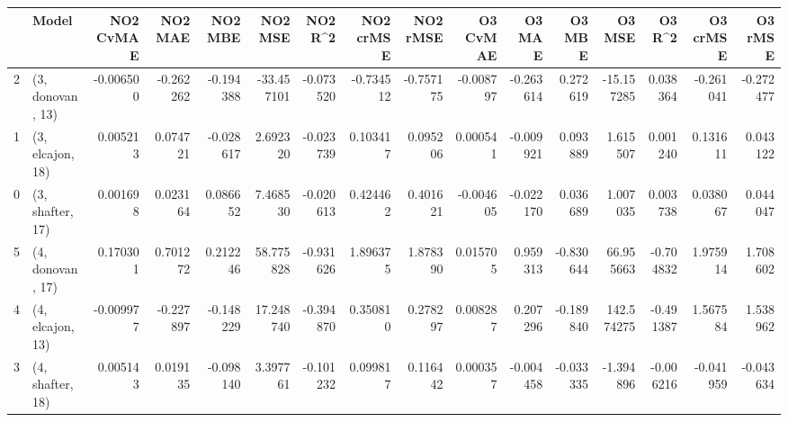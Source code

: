 \begin{tabular}{llrrrrrrrrrrrrrr}
\toprule
{} &             Model &  NO2 CvMAE &   NO2 MAE &   NO2 MBE &    NO2 MSE &   NO2 R\textasciicircum2 &  NO2 crMSE &  NO2 rMSE &  O3 CvMAE &    O3 MAE &    O3 MBE &      O3 MSE &    O3 R\textasciicircum2 &  O3 crMSE &   O3 rMSE \\
\midrule
2 &  (3, donovan, 13) &  -0.006500 & -0.262262 & -0.194388 & -33.457101 & -0.073520 &  -0.734512 & -0.757175 & -0.008797 & -0.263614 &  0.272619 &  -15.157285 &  0.038364 & -0.261041 & -0.272477 \\
1 &  (3, elcajon, 18) &   0.005213 &  0.074721 & -0.028617 &   2.692320 & -0.023739 &   0.103417 &  0.095206 &  0.000541 & -0.009921 &  0.093889 &    1.615507 &  0.001240 &  0.131611 &  0.043122 \\
0 &  (3, shafter, 17) &   0.001698 &  0.023164 &  0.086652 &   7.468530 & -0.020613 &   0.424462 &  0.401621 & -0.004605 & -0.022170 &  0.036689 &    1.007035 &  0.003738 &  0.038067 &  0.044047 \\
5 &  (4, donovan, 17) &   0.170301 &  0.701272 &  0.212246 &  58.775828 & -0.931626 &   1.896375 &  1.878390 &  0.015705 &  0.959313 & -0.830644 &   66.955663 & -0.704832 &  1.975914 &  1.708602 \\
4 &  (4, elcajon, 13) &  -0.009977 & -0.227897 & -0.148229 &  17.248740 & -0.394870 &   0.350810 &  0.278297 &  0.008287 &  0.207296 & -0.189840 &  142.574275 & -0.491387 &  1.567584 &  1.538962 \\
3 &  (4, shafter, 18) &   0.005143 &  0.019135 & -0.098140 &   3.397761 & -0.101232 &   0.099817 &  0.116442 &  0.000357 & -0.004458 & -0.033335 &   -1.394896 & -0.006216 & -0.041959 & -0.043634 \\
\bottomrule
\end{tabular}
